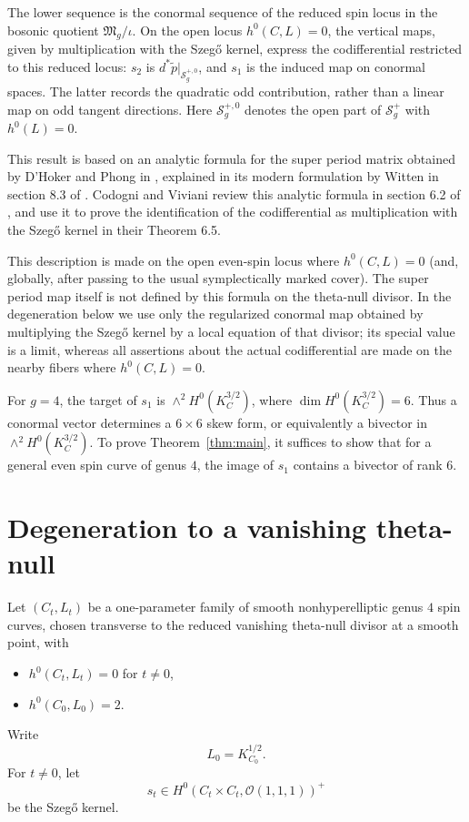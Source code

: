 \documentclass[10pt,a4paper]{amsart}
\newcommand{\OO}{\mathcal O}
\newcommand{\FM}{\mathfrak M}
\newcommand{\SSS}{\mathcal S}
\begin{document}
\begingroup
The lower sequence is the conormal sequence of the reduced spin locus
in the bosonic quotient $\FM_g/\iota$. On the open locus $h^0(C,L)=0$,
the vertical maps, given by multiplication with the Szeg\H{o} kernel,
express the codifferential restricted to this reduced locus:
$s_2$ is $d^*\widetilde p|_{\SSS_g^{+,0}}$, and $s_1$ is the induced
map on conormal spaces. The latter records the quadratic odd
contribution, rather than a linear map on odd tangent directions.
Here $\SSS_g^{+,0}$ denotes the open part of $\SSS_g^+$ with $h^0(L)=0$.
\endgroup


This result is based on an analytic formula for the super period matrix
obtained by D’Hoker and Phong in \cite{DP},
explained in its modern formulation by Witten in section 8.3 of \cite{W}.
Codogni and Viviani review this analytic formula in section 6.2 of \cite{CV},
and use it to prove the identification of the codifferential
as multiplication with the Szeg\H{o} kernel in their Theorem 6.5.

This description is made on the open even-spin locus where $h^0(C,L)=0$
(and, globally, after passing to the usual symplectically marked cover).
The super period map itself is not defined by this formula on the
theta-null divisor.  In the degeneration below we use only the
regularized conormal map obtained by multiplying the Szeg\H{o} kernel by
a local equation of that divisor; its special value is a limit, whereas
all assertions about the actual codifferential are made on the nearby
fibers where $h^0(C,L)=0$.




For $g=4$, the target of $s_1$ is
$\wedge^2 H^0(K_C^{3/2})$, where
$\dim H^0(K_C^{3/2})=6.$
Thus a conormal vector determines a $6\times6$ skew form, or equivalently a bivector in
$\wedge^2 H^0(K_C^{3/2})$.
To prove Theorem~\ref{thm:main}, it suffices to show that for a general {even} spin curve of genus $4$,
the image of $s_1$ contains a bivector of rank $6$.

\section{Degeneration to a vanishing theta-null}

Let $(C_t,L_t)$ be a one-parameter family of smooth {nonhyperelliptic} genus $4$ spin curves, chosen transverse to the {reduced} vanishing theta-null divisor {at a smooth point}, with
\begin{itemize}[leftmargin=2em]
\item $h^0(C_t,L_t)=0$ for $t\neq 0$,
\item $h^0(C_0,L_0)=2$.
\end{itemize}
Write
\[
L_0=K_{C_0}^{1/2}.
\]
For $t\neq 0$, let
\[
s_t\in {H^0(C_t\times C_t,\OO(1,1,1))^+}
\]
be the Szeg\H{o} kernel.
\end{document}
